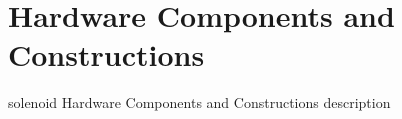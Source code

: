 \section{Hardware Components and Constructions}

solenoid Hardware Components and Constructions description

